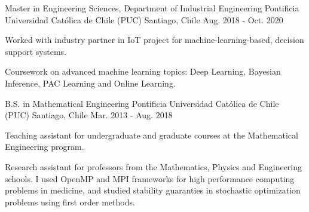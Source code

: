 

\begin{cventries}
\cventry
{Master in Engineering Sciences, Department of Industrial Engineering} %
{Pontificia Universidad Católica de Chile (PUC)} %
{Santiago, Chile} %
{Aug. 2018 - Oct. 2020} %
{
  \begin{cvitems} %
    \item {Worked with industry partner in IoT project for machine-learning-based, decision support systems.}
    \item {Coursework on advanced machine learning topics: Deep Learning, Bayesian Inference, PAC Learning and Online Learning.} 
  \end{cvitems}
}

  \cventry
    {B.S. in Mathematical Engineering} %
    {Pontificia Universidad Católica de Chile (PUC)} %
    {Santiago, Chile} %
    {Mar. 2013 - Aug. 2018} %
    {
      \begin{cvitems} %
        \item {Teaching assistant for undergraduate and graduate courses at the Mathematical Engineering program.}
        \item {Research assistant for professors from the Mathematics, Physics and Engineering schools. 
        I used OpenMP and MPI frameworks for high performance computing problems in medicine, and studied stability
        guaranties in stochastic optimization problems using first order methods.}
      \end{cvitems}
    }

\end{cventries}
